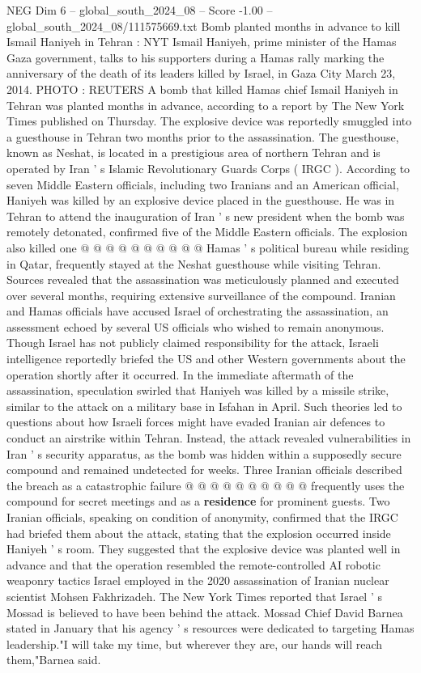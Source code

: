 \begin{textsample}{NEG Dim 6 – global\_south\_2024\_08 – Score -1.00 – global\_south\_2024\_08/111575669.txt}  \label{ex:f6_neg_129}
Bomb planted months in advance to kill Ismail Haniyeh in Tehran : NYT Ismail Haniyeh, prime minister of the Hamas Gaza government, talks to his supporters during a Hamas rally marking the anniversary of the death of its leaders killed by Israel, in Gaza City March 23, 2014.
PHOTO : REUTERS A bomb that killed Hamas chief Ismail Haniyeh in Tehran was planted months in advance, according to a report by The New York Times published on Thursday.
The explosive device was reportedly smuggled into a guesthouse in Tehran two months prior to the assassination.
The guesthouse, known as Neshat, is located in a prestigious area of northern Tehran and is operated by Iran ' s Islamic Revolutionary Guards Corps ( IRGC ).
According to seven Middle Eastern officials, including two Iranians and an American official, Haniyeh was killed by an explosive device placed in the guesthouse.
He was in Tehran to attend the inauguration of Iran ' s new president when the bomb was remotely detonated, confirmed five of the Middle Eastern officials.
The explosion also killed one @ @ @ @ @ @ @ @ @ @ Hamas ' s political bureau while residing in Qatar, frequently stayed at the Neshat guesthouse while visiting Tehran.
Sources revealed that the assassination was meticulously planned and executed over several months, requiring extensive surveillance of the compound.
Iranian and Hamas officials have accused Israel of orchestrating the assassination, an assessment echoed by several US officials who wished to remain anonymous.
Though Israel has not publicly claimed responsibility for the attack, Israeli intelligence reportedly briefed the US and other Western governments about the operation shortly after it occurred.
In the immediate aftermath of the assassination, speculation swirled that Haniyeh was killed by a missile strike, similar to the attack on a military base in Isfahan in April.
Such theories led to questions about how Israeli forces might have evaded Iranian air defences to conduct an airstrike within Tehran.
Instead, the attack revealed vulnerabilities in Iran ' s security apparatus, as the bomb was hidden within a supposedly secure compound and remained undetected for weeks.
Three Iranian officials described the breach as a catastrophic failure @ @ @ @ @ @ @ @ @ @ frequently uses the compound for secret meetings and as a \textbf{residence} for prominent guests.
Two Iranian officials, speaking on condition of anonymity, confirmed that the IRGC had briefed them about the attack, stating that the explosion occurred inside Haniyeh ' s room.
They suggested that the explosive device was planted well in advance and that the operation resembled the remote-controlled AI robotic weaponry tactics Israel employed in the 2020 assassination of Iranian nuclear scientist Mohsen Fakhrizadeh.
The New York Times reported that Israel ' s Mossad is believed to have been behind the attack.
Mossad Chief David Barnea stated in January that his agency ' s resources were dedicated to targeting Hamas leadership."I will take my time, but wherever they are, our hands will reach them,"Barnea said.

\end{textsample}
